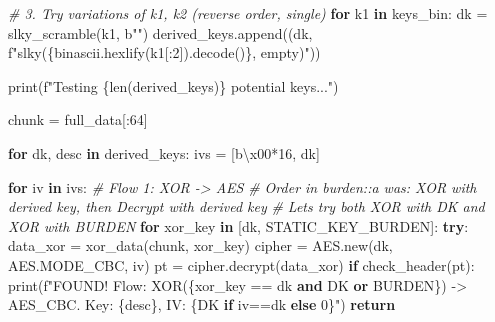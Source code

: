 \documentclass[
]{article}
\newenvironment{Shaded}{}{}
\newcommand{\BuiltInTok}[1]{\textcolor[rgb]{0.00,0.50,0.00}{#1}}
\newcommand{\CharTok}[1]{\textcolor[rgb]{0.25,0.44,0.63}{#1}}
\newcommand{\CommentTok}[1]{\textcolor[rgb]{0.38,0.63,0.69}{\textit{#1}}}
\newcommand{\ControlFlowTok}[1]{\textcolor[rgb]{0.00,0.44,0.13}{\textbf{#1}}}
\newcommand{\DecValTok}[1]{\textcolor[rgb]{0.25,0.63,0.44}{#1}}
\newcommand{\KeywordTok}[1]{\textcolor[rgb]{0.00,0.44,0.13}{\textbf{#1}}}
\newcommand{\NormalTok}[1]{#1}
\newcommand{\OperatorTok}[1]{\textcolor[rgb]{0.40,0.40,0.40}{#1}}
\newcommand{\SpecialCharTok}[1]{\textcolor[rgb]{0.25,0.44,0.63}{#1}}
\newcommand{\SpecialStringTok}[1]{\textcolor[rgb]{0.73,0.40,0.53}{#1}}
\newcommand{\StringTok}[1]{\textcolor[rgb]{0.25,0.44,0.63}{#1}}
\begin{document}
\begin{Shaded}
\begin{Highlighting}[]
    \CommentTok{\# 3. Try variations of k1, k2 (reverse order, single)}
    \ControlFlowTok{for}\NormalTok{ k1 }\KeywordTok{in}\NormalTok{ keys\_bin:}
\NormalTok{        dk }\OperatorTok{=}\NormalTok{ slky\_scramble(k1, }\StringTok{b""}\NormalTok{)}
\NormalTok{        derived\_keys.append((dk, }\SpecialStringTok{f"slky(}\SpecialCharTok{\{}\NormalTok{binascii}\SpecialCharTok{.}\NormalTok{hexlify(k1[:}\DecValTok{2}\NormalTok{])}\SpecialCharTok{.}\NormalTok{decode()}\SpecialCharTok{\}}\SpecialStringTok{, empty)"}\NormalTok{))}

    \BuiltInTok{print}\NormalTok{(}\SpecialStringTok{f"Testing }\SpecialCharTok{\{}\BuiltInTok{len}\NormalTok{(derived\_keys)}\SpecialCharTok{\}}\SpecialStringTok{ potential keys..."}\NormalTok{)}
    
\NormalTok{    chunk }\OperatorTok{=}\NormalTok{ full\_data[:}\DecValTok{64}\NormalTok{]}
    
    \ControlFlowTok{for}\NormalTok{ dk, desc }\KeywordTok{in}\NormalTok{ derived\_keys:}
\NormalTok{        ivs }\OperatorTok{=}\NormalTok{ [}\StringTok{b\textquotesingle{}}\CharTok{\textbackslash{}x00}\StringTok{\textquotesingle{}}\OperatorTok{*}\DecValTok{16}\NormalTok{, dk]}
        
        \ControlFlowTok{for}\NormalTok{ iv }\KeywordTok{in}\NormalTok{ ivs:}
            \CommentTok{\# Flow 1: XOR {-}\textgreater{} AES}
            \CommentTok{\# Order in burden::a was: XOR with derived key, then Decrypt with derived key}
            \CommentTok{\# Let\textquotesingle{}s try both XOR with DK and XOR with BURDEN}
            \ControlFlowTok{for}\NormalTok{ xor\_key }\KeywordTok{in}\NormalTok{ [dk, STATIC\_KEY\_BURDEN]:}
                \ControlFlowTok{try}\NormalTok{:}
\NormalTok{                    data\_xor }\OperatorTok{=}\NormalTok{ xor\_data(chunk, xor\_key)}
\NormalTok{                    cipher }\OperatorTok{=}\NormalTok{ AES.new(dk, AES.MODE\_CBC, iv)}
\NormalTok{                    pt }\OperatorTok{=}\NormalTok{ cipher.decrypt(data\_xor)}
                    \ControlFlowTok{if}\NormalTok{ check\_header(pt):}
                        \BuiltInTok{print}\NormalTok{(}\SpecialStringTok{f"FOUND! Flow: XOR(}\SpecialCharTok{\{}\NormalTok{xor\_key }\OperatorTok{==}\NormalTok{ dk }\KeywordTok{and} \StringTok{\textquotesingle{}DK\textquotesingle{}} \KeywordTok{or} \StringTok{\textquotesingle{}BURDEN\textquotesingle{}}\SpecialCharTok{\}}\SpecialStringTok{) {-}\textgreater{} AES\_CBC. Key: }\SpecialCharTok{\{}\NormalTok{desc}\SpecialCharTok{\}}\SpecialStringTok{, IV: }\SpecialCharTok{\{}\StringTok{\textquotesingle{}DK\textquotesingle{}} \ControlFlowTok{if}\NormalTok{ iv}\OperatorTok{==}\NormalTok{dk }\ControlFlowTok{else} \StringTok{\textquotesingle{}0\textquotesingle{}}\SpecialCharTok{\}}\SpecialStringTok{"}\NormalTok{)}
                        \ControlFlowTok{return}
                    

\end{Highlighting}
\end{Shaded}
\end{document}
